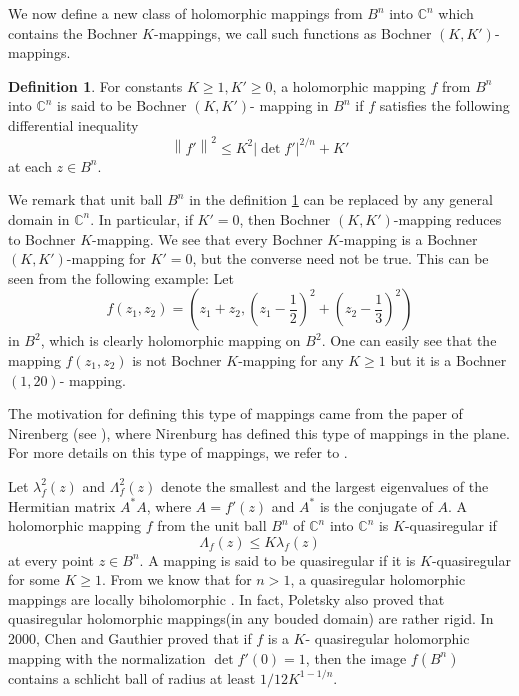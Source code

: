 \documentclass[a4paper,12pt,reqno]{amsart}
\theoremstyle{plain}
\theoremstyle{definition}
\newtheorem{defn}{Definition}[section]
\newcommand{\IC}{{\mathbb C}}
\numberwithin{equation}{section}
\begin{document}
We now define a new class of holomorphic mappings from $B^n$ into $\mathbb{C}^n$ which contains the Bochner $K$-mappings, we call such functions as Bochner $\left(K, K'\right)$- mappings.
\begin{defn}\label{Rohi-Vasu-P2-Definition-001}
For constants $K\geq1, K'\geq0$, a holomorphic mapping $f$ from $B^n$ into $\mathbb{C}^n$ is said to be Bochner $\left(K, K'\right)$- mapping in $B^n$ if $f$ satisfies the following differential inequality
$$
\left\|f'\right\|^2 \leq K^2\left|\operatorname{det} f'\right|^{2/n}+K' 
$$
at each $z \in B^n$.
\end{defn}

We remark that unit ball $B^n$ in the definition \ref{Rohi-Vasu-P2-Definition-001} can be replaced by any general domain in $\mathbb{C}^n$. In particular, if $K'=0$, then Bochner $(K,K')$-mapping reduces to Bochner $K$-mapping. We see that every Bochner $K$-mapping is a Bochner $(K,K')$-mapping for $K'=0$, but the converse need not be true. This can be seen from the following example: Let $$f(z_1,z_2)=\left(z_1+z_2, \left(z_1-\frac{1}{2}\right)^2+\left(z_2-\frac{1}{3}\right)^2\right)$$ in $B^2$, which is clearly holomorphic mapping on $B^2.$ One can easily see that the mapping $f(z_1,z_2)$ is not Bochner $K$-mapping for any $K\geq 1$ but it is a Bochner $(1,20)$- mapping.
\vspace{2mm}

 The motivation for defining this type of mappings came from the paper of Nirenberg (see \cite{Nirenberg-1953}), where Nirenburg has defined this type of mappings in the plane. For more details on this type of mappings, we refer to  \cite{Allu-Kumar-2024,Chen-Li-Sahoo-Wang-2017,Chen-Ponnusamy-2020,Chen-Ponnusamy-Wang-2021,Finn-Serrin-1958,Nirenberg-1953}.
 \vspace{2mm}

Let $\lambda_f^2(z)$ and $\Lambda_f^2(z)$ denote the smallest and the largest eigenvalues of the Hermitian matrix $A^*A$, where $A=f'(z)$ and $A^*$ is the conjugate of $A$. A holomorphic mapping $f$ from the unit ball $B^n$ of $\IC^n$ into $\IC^n$ is $K$-quasiregular if
 $$\Lambda_f(z)\leq K \lambda_f(z)$$ 
 at every point $z \in B^n$. A mapping is said to be quasiregular if it is $K$-quasiregular for some $K\geq 1$. From \cite{Marden-Rickman-1974} we know that for $n>1$, a quasiregular holomorphic mappings are locally biholomorphic . In fact, Poletsky \cite{Poletsky-1985} also proved that quasiregular holomorphic mappings(in any bouded domain) are rather rigid.  In 2000, Chen and Gauthier \cite{Chen-Gauthier-2000} proved that if $f$ is a $K$- quasiregular holomorphic mapping with the normalization $\operatorname{det} f'(0)=1$, then the image $f(B^n)$ contains a schlicht ball of radius at least $1/12K^{1-1/n}$.
 \vspace{2mm}
\end{document}
